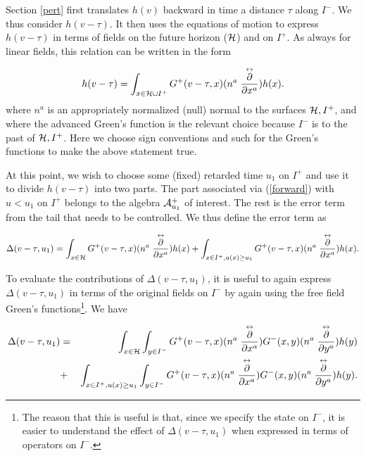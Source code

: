 \documentclass[12pt,onecolumn,eqsecnum,aps,prd,nofootinbib]{revtex4}
\begin{document}
Section \ref{pert} first translates $h(v)$ backward in time a distance $\tau$ along $I^-$.  We thus consider $h(v-\tau)$.  It then uses the equations of motion to express $h(v-\tau)$ in terms of fields on the future horizon (${\cal H}$) and on $I^+$.  As always for linear fields, this relation can be written in the form

\begin{equation}
\label{forward}
h(v - \tau) = \int_{x \in {\cal H} \cup I^+}  G^+(v-\tau, x)   (n^a  \stackrel
{\leftrightarrow} {\frac{ \partial}{\partial x^a} }) h(x) .
\end{equation}
where $n^a$ is an appropriately normalized (null) normal to the surfaces ${\cal H}, I^+$, and where the advanced Green's function is the relevant choice because $I^-$ is to the past of ${\cal H}, I^+$.  Here we choose sign conventions and such for the Green's functions to make the above statement true.

At this point, we wish to choose some (fixed) retarded time $u_1$ on $I^+$ and use it to divide $h(v-\tau)$ into two parts.  The part associated via (\ref{forward}) with $u < u_1$ on $I^+$ belongs to the algebra ${\cal A}_{u_1}^+$ of interest.  The rest is the error term from the tail that needs to be controlled.  We thus define the error term as

\begin{equation}
\label{forward}
\Delta(v - \tau, u_1) = \int_{x \in {\cal H}}  G^+(v-\tau, x)   (n^a  \stackrel
{\leftrightarrow} {\frac{ \partial}{\partial x^a} }) h(x) +  \int_{x \in {I^+}, u(x) \ge u_1}  G^+(v-\tau, x)   (n^a  \stackrel
{\leftrightarrow} {\frac{ \partial}{\partial x^a} }) h(x) .
\end{equation}

To evaluate the contributions of $\Delta(v-\tau, u_1)$, it is useful to {\rm again} express $\Delta(v-\tau, u_1)$ in terms of the original fields on $I^-$ by again using the free field Green's functions\footnote{The reason that this is useful is that, since we specify the state on $I^-$, it is easier to understand the effect of 
$\Delta(v-\tau, u_1)$ when expressed in terms of operators on $I^-$.}.  We have

\begin{eqnarray}
\label{forback}
\Delta(v - \tau, u_1) &=& \int_{x \in {\cal H}} \int_{y \in I^-} G^+(v-\tau, x)   (n^a  \stackrel
{\leftrightarrow} {\frac{ \partial}{\partial x^a} }) G^-(x, y)   (n^a  \stackrel
{\leftrightarrow} {\frac{ \partial}{\partial y^a} })  h(y) \cr &+&  \int_{x \in {I^+}, u(x) \ge u_1}  \int_{y \in I^-} G^+(v-\tau, x)   (n^a  \stackrel
{\leftrightarrow} {\frac{ \partial}{\partial x^a} }) G^-(x, y)   (n^a  \stackrel
{\leftrightarrow} {\frac{ \partial}{\partial y^a} })  h(y) .
\end{eqnarray}
\end{document}
